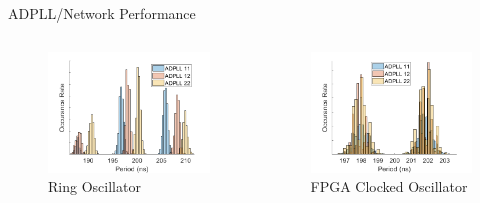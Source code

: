 \documentclass{beamer}
\begin{document}
\begin{frame}{ADPLL/Network Performance}
	\vspace{-0.4 cm}
	\begin{columns}
		\begin{figure}
			\includegraphics[width=\linewidth]{../conf_paper/distrib_ring}
			\vspace{-0.8 cm}
			\caption{Ring Oscillator}
		\end{figure}
		\begin{figure}
			\includegraphics[width=\linewidth]{../conf_paper/distrib_pa}
			\vspace{-0.8 cm}
			\caption{FPGA Clocked Oscillator}
		\end{figure}
	\end{columns}


\end{frame}
\end{document}
